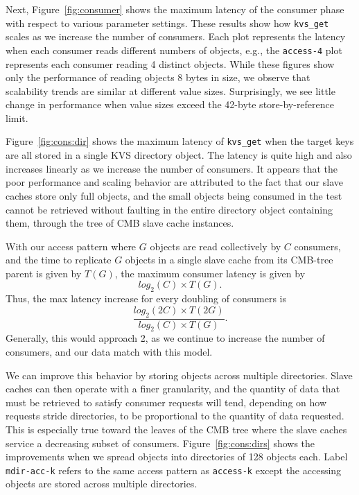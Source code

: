 Next, Figure~\ref{fig:consumer} shows the maximum latency of the consumer
phase with respect to various parameter settings. 
These results show how {\tt kvs\_get}
scales as we increase the number of consumers. Each plot represents
the latency when each consumer reads different numbers of 
objects, e.g., the {\tt access-4} plot represents each consumer reading
4 distinct objects.  While these figures show only the performance of reading
objects 8 bytes in size, we observe that 
scalability trends are similar at different value sizes.
Surprisingly, we see little change in performance when value sizes
exceed the 42-byte store-by-reference limit.

Figure~\ref{fig:cons:dir} shows the maximum latency of {\tt kvs\_get}
when the target keys are all stored in a single
KVS directory object. The latency is quite high and also increases
linearly as we increase the number of consumers. 
It appears that the poor performance and scaling behavior 
are attributed to the fact that our slave caches store only full
objects, and the small objects being consumed in the test cannot
be retrieved without faulting in the entire directory object
containing them, through the tree of CMB slave cache instances.

With our access pattern where $G$ objects are read collectively by
$C$ consumers, and the time to replicate $G$ objects in a single slave cache
from its CMB-tree parent is given by $T(G)$, the maximum consumer latency is given by
\begin{equation}
log_2(C) \times T(G).
\end{equation}
Thus, the max latency increase for every doubling of consumers is
\begin{equation}
\frac{log_2(2C) \times T(2G)}{log_2(C) \times T(G)}.
\end{equation}
Generally, this would approach 2, 
as we continue to increase the number of consumers,
and our data match with this model.

We can improve this behavior by storing objects across multiple
directories. Slave caches can then operate with a finer granularity,
and the quantity of data that must be retrieved to satisfy consumer
requests will tend, depending on how requests stride directories,
to be proportional to the quantity of data requested.
This is especially true toward the leaves of the CMB tree where the
slave caches service a decreasing subset of consumers.
Figure~\ref{fig:cons:dirs} shows the improvements 
when we spread objects into directories of 128 objects each.
Label {\tt mdir-acc-k} refers to the same access pattern as {\tt access-k} 
except the accessing objects are stored across multiple directories.

